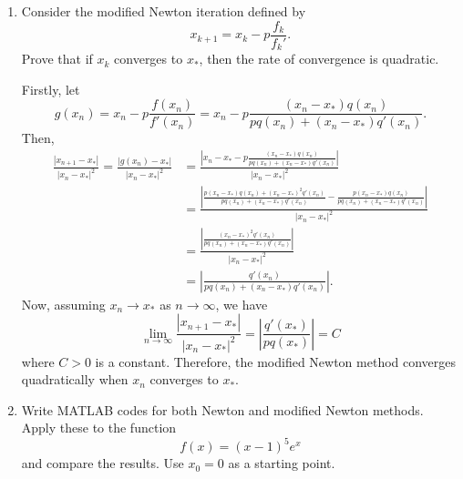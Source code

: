 \documentclass[a4paper,12pt]{article}
\newcommand{\abs}[1]{\left| #1 \right|}
\begin{document}
\begin{enumerate}[label = \arabic*.]
\begin{enumerate}[label = \roman*.]
			\item Consider the modified Newton iteration defined by 
			\[
				x_{k+1} = x_k - p \frac{f_k}{f_k'}.
			\]
			Prove that if $ x_k $ converges to $ x_* $, then the rate of convergence is quadratic.
            
            Firstly, let
            \[
                g(x_n) = x_n - p\frac{f(x_n)}{f'(x_n)} = x_n - p\frac{(x_n - x_*)q(x_n)}{p q(x_n) + (x_n - x_*)q'(x_n)}.
            \]
            Then,
            \begin{align*}
                \frac{\abs{x_{n+1} - x_*}}{\abs{x_n - x_*}^2} = \frac{\abs{g(x_n) - x_*}}{\abs{x_n - x_*}^2} &= \frac{\abs{x_n - x_* - p\frac{(x_n - x_*)q(x_n)}{p q(x_n) + (x_n - x_*)q'(x_n)}}}{\abs{x_n - x_*}^2} \\
                &= \frac{\abs{\frac{p(x_n - x_*)q(x_n) + (x_n - x_*)^2q'(x_n)}{p q(x_n) + (x_n - x_*)q'(x_n)} -\frac{p(x_n - x_*)q(x_n)}{p q(x_n) + (x_n - x_*)q'(x_n)}} }{\abs{x_n - x_*}^2} \\
                &= \frac{\abs{\frac{(x_n - x_*)^2q'(x_n)}{p q(x_n) + (x_n - x_*)q'(x_n)}}}{\abs{x_n - x_*}^2} \\
                &= \abs{\frac{q'(x_n)}{p q(x_n) + (x_n - x_*)q'(x_n)}}.
            \end{align*}
            Now, assuming $ x_n \to x_* $ as $ n \to \infty $, we have
            \[
                \lim_{n \to \infty}  \frac{\abs{x_{n+1} - x_*}}{\abs{x_n - x_*}^2} = \abs{\frac{q'(x_*)}{pq(x_*)}} = C
            \]
            where $ C > 0 $ is a constant. Therefore, the modified Newton method converges quadratically when $ x_n $ converges to $ x_* $.
				
			\item Write MATLAB codes for both Newton and modified Newton methods. Apply these to the function
			\[
				f(x) = (x-1)^5 e^x
			\]
			and compare the results. Use $ x_0 = 0 $ as a starting point.
            

\end{enumerate}
\end{enumerate}
\end{document}
